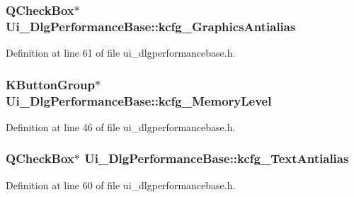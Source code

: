 \hypertarget{classUi__DlgPerformanceBase_af914dbe5898bd1c2e48be6cce58738f3}{
\subsubsection[{kcfg\+\_\+\+Graphics\+Antialias}]{\setlength{\rightskip}{0pt plus 5cm}Q\+Check\+Box$\ast$ Ui\+\_\+\+Dlg\+Performance\+Base\+::kcfg\+\_\+\+Graphics\+Antialias}}\label{classUi__DlgPerformanceBase_af914dbe5898bd1c2e48be6cce58738f3}


Definition at line 61 of file ui\+\_\+dlgperformancebase.\+h.

\hypertarget{classUi__DlgPerformanceBase_a93edac845d7c5b17eb8daf50d97d0e3f}{
\subsubsection[{kcfg\+\_\+\+Memory\+Level}]{\setlength{\rightskip}{0pt plus 5cm}K\+Button\+Group$\ast$ Ui\+\_\+\+Dlg\+Performance\+Base\+::kcfg\+\_\+\+Memory\+Level}}\label{classUi__DlgPerformanceBase_a93edac845d7c5b17eb8daf50d97d0e3f}


Definition at line 46 of file ui\+\_\+dlgperformancebase.\+h.

\hypertarget{classUi__DlgPerformanceBase_ac4dd2f966263b10e62eb0e13be099c7c}{
\subsubsection[{kcfg\+\_\+\+Text\+Antialias}]{\setlength{\rightskip}{0pt plus 5cm}Q\+Check\+Box$\ast$ Ui\+\_\+\+Dlg\+Performance\+Base\+::kcfg\+\_\+\+Text\+Antialias}}\label{classUi__DlgPerformanceBase_ac4dd2f966263b10e62eb0e13be099c7c}


Definition at line 60 of file ui\+\_\+dlgperformancebase.\+h.

